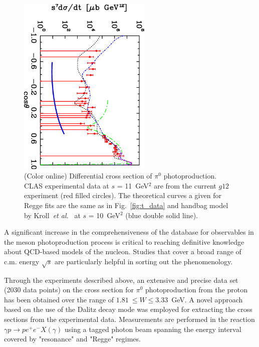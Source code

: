 \documentclass[aps,prc,twocolumn,floatfix,showpacs,preprintnumbers,amsmath,amssymb,superscriptaddress]{revtex4-1}
\begin{document}
\begin{figure}[htb!]
\centerline{
        \includegraphics[width=2.5in, angle=90]{kroll.eps}}

        \caption {(Color online) Differential cross section 
		of $\pi^0$ photoproduction. CLAS experimental 
		data at $s$ = 11~GeV$^2$ are from the 
		current $g12$ experiment (red filled circles).  
		The theoretical curves a given for Regge 
		fits are the same as in 
		Fig.~\protect\ref{fig:t_data} and handbag model 
		by Kroll~\protect\textit{et 
		al.}~\protect\cite{Kroll} at $s$ = 10~GeV$^2$ 
		(blue double solid line).} 
		\label{fig:kroll}
\end{figure}
A significant increase in the 
comprehensiveness of the database for observables in the meson 
photoproduction process is critical to reaching definitive 
knowledge about QCD-based models of the nucleon. Studies that 
cover a broad range of c.m. energy $\sqrt{s}$ are particularly 
helpful in sorting out the phenomenology.

Through the experiments described above, an extensive and
precise data set (2030 data points) on the cross section for 
$\pi^0$ photoproduction from the proton has been obtained over 
the range of $1.81~\leq W\leq 3.33$~GeV. A novel approach based 
on the use of the Dalitz decay mode was employed for extracting the 
cross sections from the experimental data. Measurements are 
performed in the reaction $\gamma p\to pe^+e^-X(\gamma)$ using a 
tagged photon beam spanning the energy interval covered by 
"resonance" and "Regge" regimes.
\end{document}

